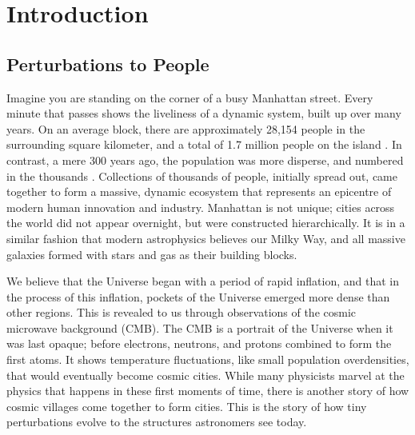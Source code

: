\chapter{Introduction} \label{ch:introduction}
\newpage

\section{Perturbations to People}

Imagine you are standing on the corner of a busy Manhattan street. Every minute that passes shows the liveliness of a dynamic system, built up over many years. On an average block, there are approximately 28,154 people in the surrounding square kilometer, and a total of 1.7 million people on the island \citep{manhattan_population_density}. In contrast, a mere 300 years ago, the population was more disperse, and numbered in the thousands \citep{history_of_nyc}. Collections of thousands of people, initially spread out, came together to form a massive, dynamic ecosystem that represents an epicentre of modern human innovation and industry. Manhattan is not unique; cities across the world did not appear overnight, but were constructed hierarchically. It is in a similar fashion that modern astrophysics believes our Milky Way, and all massive galaxies formed with stars and gas as their building blocks.

We believe that the Universe began with a period of rapid inflation, and that in the process of this inflation, pockets of the Universe emerged more dense than other regions. This is revealed to us through observations of the cosmic microwave background (CMB). The CMB is a portrait of the Universe when it was last opaque; before electrons, neutrons, and protons combined to form the first atoms. It shows temperature fluctuations, like small population overdensities, that would eventually become cosmic cities.  While many physicists marvel at the physics that happens in these first moments of time, there is another story of how cosmic villages come together to form cities. This is the story of how tiny perturbations evolve to the structures astronomers see today.

